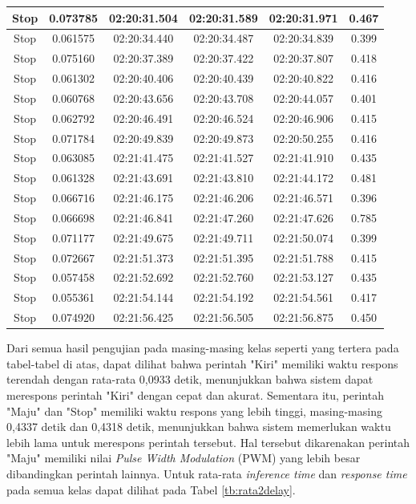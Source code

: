 \begin{longtable}{|c|c|c|c|c|c|}
      Stop & 0.073785 & 02:20:31.504 & 02:20:31.589 & 02:20:31.971 & 0.467 \\ \hline
      Stop & 0.061575 & 02:20:34.440 & 02:20:34.487 & 02:20:34.839 & 0.399 \\ \hline
      Stop & 0.075160 & 02:20:37.389 & 02:20:37.422 & 02:20:37.807 & 0.418 \\ \hline
      Stop & 0.061302 & 02:20:40.406 & 02:20:40.439 & 02:20:40.822 & 0.416 \\ \hline
      Stop & 0.060768 & 02:20:43.656 & 02:20:43.708 & 02:20:44.057 & 0.401 \\ \hline
      Stop & 0.062792 & 02:20:46.491 & 02:20:46.524 & 02:20:46.906 & 0.415 \\ \hline
      Stop & 0.071784 & 02:20:49.839 & 02:20:49.873 & 02:20:50.255 & 0.416 \\ \hline
      Stop & 0.063085 & 02:21:41.475 & 02:21:41.527 & 02:21:41.910 & 0.435 \\ \hline
      Stop & 0.061328 & 02:21:43.691 & 02:21:43.810 & 02:21:44.172 & 0.481 \\ \hline
      Stop & 0.066716 & 02:21:46.175 & 02:21:46.206 & 02:21:46.571 & 0.396 \\ \hline
      Stop & 0.066698 & 02:21:46.841 & 02:21:47.260 & 02:21:47.626 & 0.785 \\ \hline
      Stop & 0.071177 & 02:21:49.675 & 02:21:49.711 & 02:21:50.074 & 0.399 \\ \hline
      Stop & 0.072667 & 02:21:51.373 & 02:21:51.395 & 02:21:51.788 & 0.415 \\ \hline
      Stop & 0.057458 & 02:21:52.692 & 02:21:52.760 & 02:21:53.127 & 0.435 \\ \hline
      Stop & 0.055361 & 02:21:54.144 & 02:21:54.192 & 02:21:54.561 & 0.417 \\ \hline
      Stop & 0.074920 & 02:21:56.425 & 02:21:56.505 & 02:21:56.875 & 0.450 \\ \hline
\end{longtable}

Dari semua hasil pengujian pada masing-masing kelas seperti yang tertera pada tabel-tabel di atas, dapat dilihat bahwa perintah "Kiri" memiliki waktu respons terendah dengan rata-rata 0,0933 detik, menunjukkan bahwa sistem dapat merespons perintah "Kiri" dengan cepat dan akurat. Sementara itu, perintah "Maju" dan "Stop" memiliki waktu respons yang lebih tinggi, masing-masing 0,4337 detik dan 0,4318 detik, menunjukkan bahwa sistem memerlukan waktu lebih lama untuk merespons perintah tersebut. Hal tersebut dikarenakan perintah "Maju" memiliki nilai \emph{Pulse Width Modulation} (PWM) yang lebih besar dibandingkan perintah lainnya. Untuk rata-rata \emph{inference time} dan \emph{response time} pada semua kelas dapat dilihat pada Tabel \ref{tb:rata2delay}.

